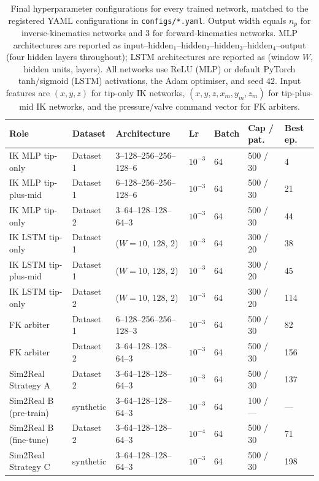 \begin{table}[!htbp]
  \centering
  \footnotesize
  \setlength{\tabcolsep}{4pt}
  \caption{Final hyperparameter configurations for every trained network, matched to the registered YAML configurations in \texttt{configs/*.yaml}. Output width equals $n_{p}$ for inverse-kinematics networks and $3$ for forward-kinematics networks. MLP architectures are reported as input--hidden$_{1}$--hidden$_{2}$--hidden$_{3}$--hidden$_{4}$--output (four hidden layers throughout); LSTM architectures are reported as (window $W$, hidden units, layers). All networks use ReLU (MLP) or default PyTorch tanh/sigmoid (LSTM) activations, the Adam optimiser, and seed $42$. Input features are $(x,y,z)$ for tip-only IK networks, $(x,y,z,x_{m},y_{m},z_{m})$ for tip-plus-mid IK networks, and the pressure/valve command vector for FK arbiters.}
  \label{tab:app_hyperparams_networks}
  \begin{tabularx}{\linewidth}{@{}l l X l l l l@{}}
    \toprule
    Role & Dataset & Architecture & Lr & Batch & Cap / pat. & Best ep. \\
    \midrule
    IK MLP tip-only         & Dataset 1 & 3--128--256--256--128--6  & $10^{-3}$ & 64 & 500 / 30 & 4   \\
    IK MLP tip-plus-mid     & Dataset 1 & 6--128--256--256--128--6  & $10^{-3}$ & 64 & 500 / 30 & 21  \\
    IK MLP tip-only         & Dataset 2 & 3--64--128--128--64--3    & $10^{-3}$ & 64 & 500 / 30 & 44  \\
    IK LSTM tip-only        & Dataset 1 & ($W{=}10$, $128$, $2$)    & $10^{-3}$ & 64 & 300 / 20 & 38  \\
    IK LSTM tip-plus-mid    & Dataset 1 & ($W{=}10$, $128$, $2$)    & $10^{-3}$ & 64 & 300 / 20 & 45  \\
    IK LSTM tip-only        & Dataset 2 & ($W{=}10$, $128$, $2$)    & $10^{-3}$ & 64 & 300 / 20 & 114 \\
    FK arbiter              & Dataset 1 & 6--128--256--256--128--3  & $10^{-3}$ & 64 & 500 / 30 & 82  \\
    FK arbiter              & Dataset 2 & 3--64--128--128--64--3    & $10^{-3}$ & 64 & 500 / 30 & 156 \\
    Sim2Real Strategy A     & Dataset 2 & 3--64--128--128--64--3    & $10^{-3}$ & 64 & 500 / 30 & 137 \\
    Sim2Real B (pre-train)  & synthetic & 3--64--128--128--64--3    & $10^{-3}$ & 64 & 100 / --- & --- \\
    Sim2Real B (fine-tune)  & Dataset 2 & 3--64--128--128--64--3    & $10^{-4}$ & 64 & 500 / 30 & 71  \\
    Sim2Real Strategy C     & synthetic & 3--64--128--128--64--3    & $10^{-3}$ & 64 & 500 / 30 & 198 \\
    \bottomrule
  \end{tabularx}


\end{table}
